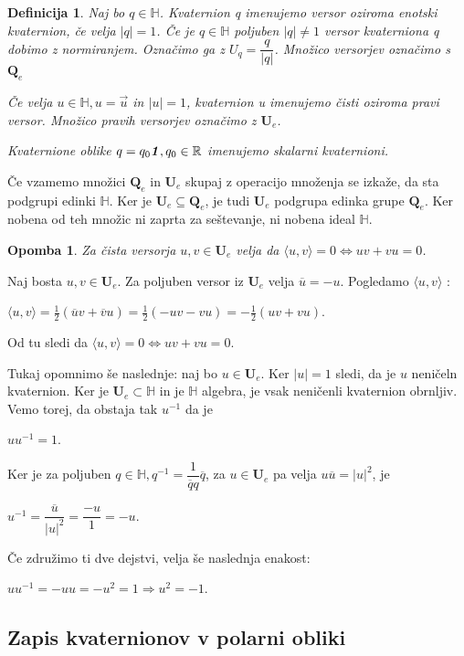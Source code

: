 \documentclass[a4paper,12pt]{article}
\def\R{\mathbb{R}} %
\def\H{\mathbb{H}} %
\def\Qe{\textbf{Q}_{e}} %
\def\Ue{\textbf{U}_{e}} %
\def\1{\textbf{\emph{1}}}
\newcommand{\dotpr}[2]{\langle #1, #2 \rangle}
\newtheorem{opomba}{Opomba}
\newtheorem{definicija}{Definicija}
\begin{document}
\begin{definicija}
   Naj bo $q \in \H$. Kvaternion q imenujemo \emph{versor} oziroma \emph{enotski kvaternion}, če velja
   $|q| = 1$. Če je $q \in \H$ poljuben $|q| \neq 1$ versor kvaterniona q dobimo z normiranjem. Označimo ga z $U_{q} = \dfrac{q}{|q|}$. 
   Množico versorjev označimo s $\Qe$

   Če velja $u \in \H, u = \vec{u}$ in $|u| = 1$, kvaternion u imenujemo \emph{čisti} oziroma \emph{pravi} versor.
   Množico pravih versorjev označimo z $\Ue$.

   Kvaternione oblike $q = q_{0}\1, q_{0} \in \R$ imenujemo \emph{skalarni kvaternioni.}
\end{definicija}
Če vzamemo množici $\Qe$ in $\Ue$ skupaj z operacijo množenja se izkaže, da sta podgrupi edinki $\H$.
Ker je $\Ue \subseteq \Qe$, je tudi $\Ue$ podgrupa edinka grupe $\Qe$. Ker nobena od teh množic ni zaprta za seštevanje, ni nobena ideal $\H$.
\begin{opomba}
   Za čista versorja $u, v \in \Ue$ velja da $\dotpr{u}{v} = 0 \iff uv + vu = 0$.
\end{opomba}
Naj bosta $u, v \in \Ue$. Za poljuben versor iz $\Ue$ velja $\overline{u} = -u$. Pogledamo $\dotpr{u}{v}$ :
\begin{center}
   $\dotpr{u}{v} = \frac{1}{2}(\overline{u}v + \overline{v}u) = \frac{1}{2}(-uv -vu) = -\frac{1}{2}(uv + vu)$.
\end{center}
Od tu sledi da $\dotpr{u}{v} = 0 \iff uv + vu = 0$.

Tukaj opomnimo še naslednje: naj bo $u \in \Ue$. Ker $|u| = 1$ sledi, da je $u$ neničeln kvaternion.
Ker je $\Ue \subset \H$ in je $\H$ algebra, je vsak neničenli kvaternion obrnljiv. Vemo torej, da obstaja tak $u^{-1}$ da je
\begin{center}
   $uu^{-1} = 1$.
\end{center}
Ker je za poljuben $q \in \H, q^{-1} = \dfrac{1}{\overline{q}q} \overline{q}$, za $u \in \Ue$ pa velja $u\overline{u} = |u|^2$, je 
\begin{center}
   $u^{-1} = \dfrac{\overline{u}}{|u|^2} = \dfrac{-u}{1} = -u$.
\end{center}
Če združimo ti dve dejstvi, velja še naslednja enakost:
\begin{center}
   $uu^{-1} = -uu = -u^2 = 1 \Rightarrow u^2 = -1$.
\end{center}

\subsection{Zapis  kvaternionov v polarni obliki}
\end{document}
